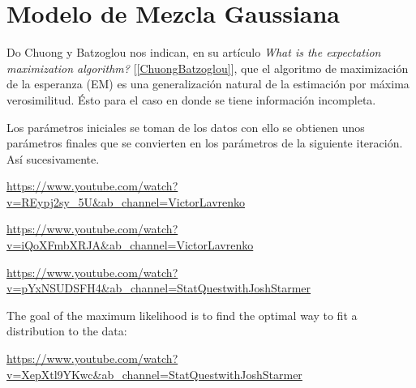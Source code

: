 \section{Modelo de Mezcla Gaussiana} \label{sec_GMM}

Do Chuong y Batzoglou nos indican, en su artículo \textit{What is the expectation maximization algorithm?} [\ref{ChuongBatzoglou}], que el algoritmo de maximización de la esperanza (EM) es una generalización natural de la estimación por máxima verosimilitud. Ésto para el caso en donde se tiene información incompleta.

Los parámetros iniciales se toman de los datos con ello se obtienen unos parámetros finales que se convierten en los parámetros de la siguiente iteración. Así sucesivamente.

\url{https://www.youtube.com/watch?v=REypj2sy_5U&ab_channel=VictorLavrenko}

\url{https://www.youtube.com/watch?v=iQoXFmbXRJA&ab_channel=VictorLavrenko}

\url{https://www.youtube.com/watch?v=pYxNSUDSFH4&ab_channel=StatQuestwithJoshStarmer}


 The goal of the maximum likelihood is to find the optimal way to fit a distribution to the data:
 
\url{https://www.youtube.com/watch?v=XepXtl9YKwc&ab_channel=StatQuestwithJoshStarmer}


%
%
%
%
%
%


